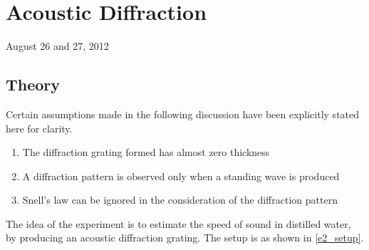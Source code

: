 \chapter{Acoustic Diffraction}
\begin{flushright}
August 26 and 27, 2012 \\
\end{flushright}

\section{Theory}
	Certain assumptions made in the following discussion have been explicitly stated here for clarity.
	\begin{enumerate}
		\item The diffraction grating formed has almost zero thickness
		\item A diffraction pattern is observed only when a standing wave is produced
		\item Snell's law can be ignored in the consideration of the diffraction pattern
	\end{enumerate}
	The idea of the experiment is to estimate the speed of sound in distilled water, by producing an acoustic diffraction grating. The setup is as shown in \autoref{e2_setup}.